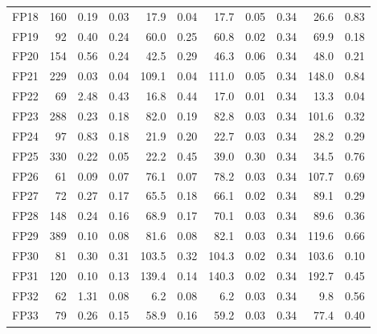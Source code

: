 \begin{longtable}[t]{lrrrrrrrrrr}
\hspace{1em}FP18 & 160 & 0.19 & 0.03 & 17.9 & 0.04 & 17.7 & 0.05 & 0.34 & 26.6 & 0.83\\
\hspace{1em}FP19 & 92 & 0.40 & 0.24 & 60.0 & 0.25 & 60.8 & 0.02 & 0.34 & 69.9 & 0.18\\
\hspace{1em}FP20 & 154 & 0.56 & 0.24 & 42.5 & 0.29 & 46.3 & 0.06 & 0.34 & 48.0 & 0.21\\
\hspace{1em}FP21 & 229 & 0.03 & 0.04 & 109.1 & 0.04 & 111.0 & 0.05 & 0.34 & 148.0 & 0.84\\
\hspace{1em}FP22 & 69 & 2.48 & 0.43 & 16.8 & 0.44 & 17.0 & 0.01 & 0.34 & 13.3 & 0.04\\
\hspace{1em}FP23 & 288 & 0.23 & 0.18 & 82.0 & 0.19 & 82.8 & 0.03 & 0.34 & 101.6 & 0.32\\
\hspace{1em}FP24 & 97 & 0.83 & 0.18 & 21.9 & 0.20 & 22.7 & 0.03 & 0.34 & 28.2 & 0.29\\
\hspace{1em}FP25 & 330 & 0.22 & 0.05 & 22.2 & 0.45 & 39.0 & 0.30 & 0.34 & 34.5 & 0.76\\
\hspace{1em}FP26 & 61 & 0.09 & 0.07 & 76.1 & 0.07 & 78.2 & 0.03 & 0.34 & 107.7 & 0.69\\
\hspace{1em}FP27 & 72 & 0.27 & 0.17 & 65.5 & 0.18 & 66.1 & 0.02 & 0.34 & 89.1 & 0.29\\
\hspace{1em}FP28 & 148 & 0.24 & 0.16 & 68.9 & 0.17 & 70.1 & 0.03 & 0.34 & 89.6 & 0.36\\
\hspace{1em}FP29 & 389 & 0.10 & 0.08 & 81.6 & 0.08 & 82.1 & 0.03 & 0.34 & 119.6 & 0.66\\
\hspace{1em}FP30 & 81 & 0.30 & 0.31 & 103.5 & 0.32 & 104.3 & 0.02 & 0.34 & 103.6 & 0.10\\
\hspace{1em}FP31 & 120 & 0.10 & 0.13 & 139.4 & 0.14 & 140.3 & 0.02 & 0.34 & 192.7 & 0.45\\
\hspace{1em}FP32 & 62 & 1.31 & 0.08 & 6.2 & 0.08 & 6.2 & 0.03 & 0.34 & 9.8 & 0.56\\
\hspace{1em}FP33 & 79 & 0.26 & 0.15 & 58.9 & 0.16 & 59.2 & 0.03 & 0.34 & 77.4 & 0.40\\

\end{longtable}
